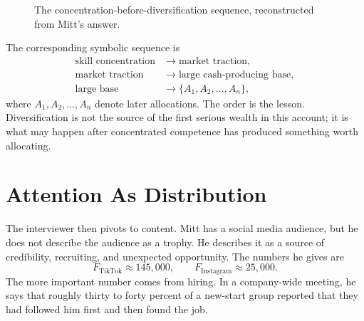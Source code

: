 \begin{figure}
\centering
{}
\caption{The concentration-before-diversification sequence, reconstructed from Mitt's answer.}
\end{figure}

The corresponding symbolic sequence is
\begin{align}
\text{skill concentration} &\longrightarrow \text{market traction},\\
\text{market traction} &\longrightarrow \text{large cash-producing base},\\
\text{large base} &\longrightarrow \{A_1,A_2,\ldots,A_n\},
\end{align}
where \(A_1,A_2,\ldots,A_n\) denote later allocations. The order is the lesson. Diversification is not the source of the first serious wealth in this account; it is what may happen after concentrated competence has produced something worth allocating.

\section{Attention As Distribution}

The interviewer then pivots to content. Mitt has a social media audience, but he does not describe the audience as a trophy. He describes it as a source of credibility, recruiting, and unexpected opportunity. The numbers he gives are
\begin{equation}
F_{\text{TikTok}}\approx 145{,}000,\qquad
F_{\text{Instagram}}\approx 25{,}000.
\end{equation}
The more important number comes from hiring. In a company-wide meeting, he says that roughly thirty to forty percent of a new-start group reported that they had followed him first and then found the job.


